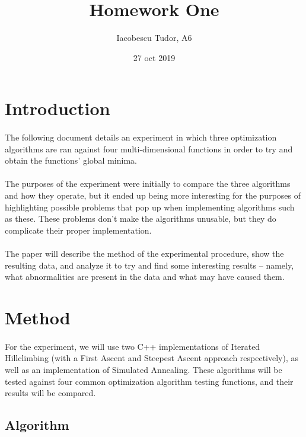 \documentclass{article}
\title{Homework One}
\date{27 oct 2019}
\author{Iacobescu Tudor, A6}
\begin{document}
	\maketitle
	
	\section{Introduction}
    \paragraph{}
    The following document details an experiment in which three optimization algorithms are ran against four multi-dimensional functions in order to try and obtain the functions' global minima.
    \paragraph{}
    The purposes of the experiment were initially to compare the three algorithms and how they operate, but it ended up being more interesting for the purposes of highlighting possible problems that pop up when implementing algorithms such as these. These problems don't make the algorithms unusable, but they do complicate their proper implementation.
    \paragraph{}
    The paper will describe the method of the experimental procedure, show the resulting data, and analyze it to try and find some interesting results -- namely, what abnormalities are present in the data and what may have caused them.

	\section{Method}
	\paragraph{}
    For the experiment, we will use two C++ implementations of Iterated Hillclimbing (with a First Ascent and Steepest Ascent approach respectively), as well as an implementation of Simulated Annealing. These algorithms will be tested against four common optimization algorithm testing functions, and their results will be compared.

    \subsection{Algorithm}
\end{document}
